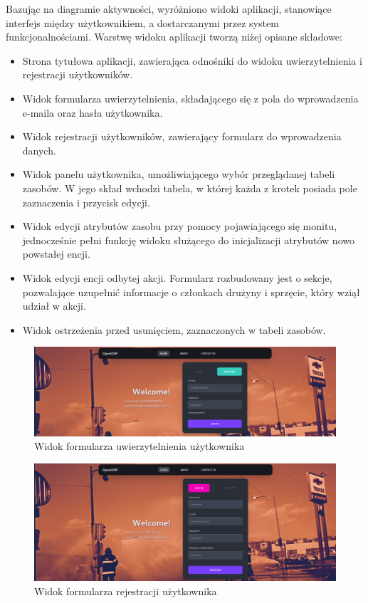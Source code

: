 Bazując na diagramie aktywności, wyróżniono widoki aplikacji, stanowiące interfejs między użytkownikiem, a dostarczanymi przez system funkcjonalnościami. Warstwę widoku aplikacji tworzą niżej opisane składowe:

\begin{itemize}
    \item Strona tytułowa aplikacji, zawierająca odnośniki do widoku uwierzytelnienia i rejestracji użytkowników.
    \item Widok formularza uwierzytelnienia, składającego się z pola do wprowadzenia e-maila oraz hasła użytkownika.
    \item Widok rejestracji użytkowników, zawierający formularz do wprowadzenia danych.
    \item Widok panelu użytkownika, umożliwiającego wybór przeglądanej tabeli zasobów. W jego skład wchodzi tabela, w której każda z krotek posiada pole zaznaczenia i przycisk edycji.
    \item Widok edycji atrybutów zasobu przy pomocy pojawiającego się monitu, jednocześnie pełni funkcję widoku służącego do inicjalizacji atrybutów nowo powstałej encji.
    \item Widok edycji encji odbytej akcji. Formularz rozbudowany jest o sekcje, pozwalające uzupełnić informacje o członkach drużyny i sprzęcie, który wziął udział w akcji.
    \item Widok ostrzeżenia przed usunięciem, zaznaczonych w tabeli zasobów.
\end{itemize}

\begin{figure}[!htbp]
\centering
\includegraphics[width=\textwidth]{img/chapter4/views/login.png}
\caption{Widok formularza uwierzytelnienia użytkownika}
\end{figure}

\begin{figure}[!htbp]
\centering
\includegraphics[width=\textwidth]{img/chapter4/views/registration.png}
\caption{Widok formularza rejestracji użytkownika}
\end{figure}

